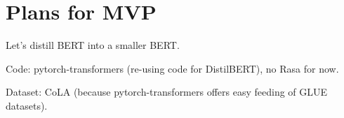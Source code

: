 \documentclass[bsc,frontabs,twoside,singlespacing,parskip,deptreport]{infthesis}
\begin{document}
{  \section{Plans for MVP}{
    Let's distill BERT into a smaller BERT.

    Code: pytorch-transformers (re-using code for DistilBERT), no Rasa for now.

    Dataset: CoLA (because pytorch-transformers offers easy feeding of GLUE datasets).
  }
}




\appendix
\end{document}
